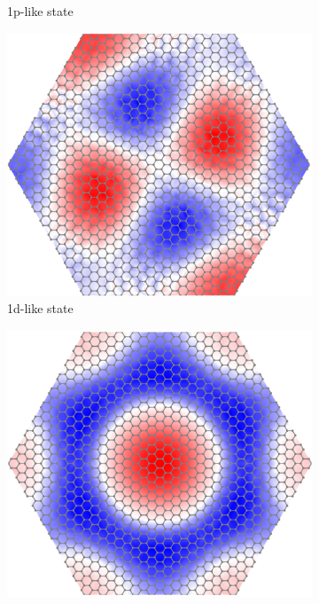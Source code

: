 \documentclass{beamer}
\begin{document}
\begin{frame}
\begin{columns}
\begin{figure}[H]
\begin{subfigure}[b]{0.45\textwidth}
        \caption{1p-like state}
        \vspace{-1ex}
      \end{subfigure}
      \begin{subfigure}[b]{0.45\textwidth}
        \centering
        \includegraphics[width=\textwidth]{img/eigenmode_1d.pdf}
        \caption{1d-like state}
        \vspace{-1ex}
      \end{subfigure}
      \begin{subfigure}[b]{0.45\textwidth}
        \centering
        \includegraphics[width=\textwidth]{img/eigenmode_2s.pdf}

\end{subfigure}
\end{figure}
\end{columns}
\end{frame}
\end{document}
